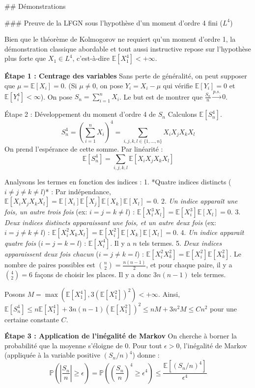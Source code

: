 \documentclass[11pt,a4paper]{article}
\begin{document}
\#\# Démonstrations

\#\#\# Preuve de la LFGN sous l'hypothèse d'un moment d'ordre 4 fini ($L^4$)

Bien que le théorème de Kolmogorov ne requiert qu'un moment d'ordre 1, la démonstration classique abordable et tout aussi instructive repose sur l'hypothèse plus forte que $X_1 \in L^4$, c'est-à-dire $\mathbb{E}[X_1^4] < +\infty$.

\textbf{Étape 1 : Centrage des variables}
Sans perte de généralité, on peut supposer que $\mu = \mathbb{E}[X_i] = 0$. (Si $\mu \neq 0$, on pose $Y_i = X_i - \mu$ qui vérifie $\mathbb{E}[Y_i]=0$ et $\mathbb{E}[Y_i^4] < \infty$).
On pose $S_n = \sum_{i=1}^n X_i$. Le but est de montrer que $\frac{S_n}{n} \xrightarrow{p.s.} 0$.

\textit{}Étape 2 : Développement du moment d'ordre 4 de $S_n$\textit{}
Calculons $\mathbb{E}[S_n^4]$.
$$ S_n^4 = \left( \sum_{i=1}^n X_i \right)^4 = \sum_{i,j,k,l \in \{1,\dots,n\}} X_i X_j X_k X_l $$
On prend l'espérance de cette somme. Par linéarité :
$$ \mathbb{E}[S_n^4] = \sum_{i,j,k,l} \mathbb{E}[X_i X_j X_k X_l] $$

Analysons les termes en fonction des indices :
1. *Quatre indices distincts ($i \neq j \neq k \neq l$)* : Par indépendance, $\mathbb{E}[X_i X_j X_k X_l] = \mathbb{E}[X_i]\mathbb{E}[X_j]\mathbb{E}[X_k]\mathbb{E}[X_l] = 0$.
2. \textit{Un indice apparaît une fois, un autre trois fois} (ex: $i=j=k \neq l$) : $\mathbb{E}[X_i^3 X_l] = \mathbb{E}[X_i^3]\mathbb{E}[X_l] = 0$.
3. \textit{Deux indices distincts apparaissant une fois, et un autre deux fois} (ex: $i=j \neq k \neq l$) : $\mathbb{E}[X_i^2 X_k X_l] = \mathbb{E}[X_i^2]\mathbb{E}[X_k]\mathbb{E}[X_l] = 0$.
4. \textit{Un indice apparaît quatre fois} ($i=j=k=l$) : $\mathbb{E}[X_i^4]$. Il y a $n$ tels termes.
5. \textit{Deux indices apparaissent deux fois chacun} ($i=j \neq k=l$) : $\mathbb{E}[X_i^2 X_k^2] = \mathbb{E}[X_i^2]\mathbb{E}[X_k^2]$. Le nombre de paires possibles est $\binom{n}{2} = \frac{n(n-1)}{2}$, et pour chaque paire, il y a $\binom{4}{2} = 6$ façons de choisir les places. Il y a donc $3n(n-1)$ tels termes.

Posons $M = \max(\mathbb{E}[X_1^4], 3(\mathbb{E}[X_1^2])^2) < +\infty$.
Ainsi, $\mathbb{E}[S_n^4] \le n \mathbb{E}[X_1^4] + 3n(n-1) (\mathbb{E}[X_1^2])^2 \le n M + 3n^2 M \le C n^2$ pour une certaine constante $C$.

\textbf{Étape 3 : Application de l'inégalité de Markov}
On cherche à borner la probabilité que la moyenne s'éloigne de $0$. Pour tout $\epsilon > 0$, l'inégalité de Markov (appliquée à la variable positive $(S_n/n)^4$) donne :
$$ \mathbb{P}\left( \left| \frac{S_n}{n} \right| \ge \epsilon \right) = \mathbb{P}\left( \left( \frac{S_n}{n} \right)^4 \ge \epsilon^4 \right) \le \frac{\mathbb{E}[(S_n/n)^4]}{\epsilon^4} $$
\end{document}
